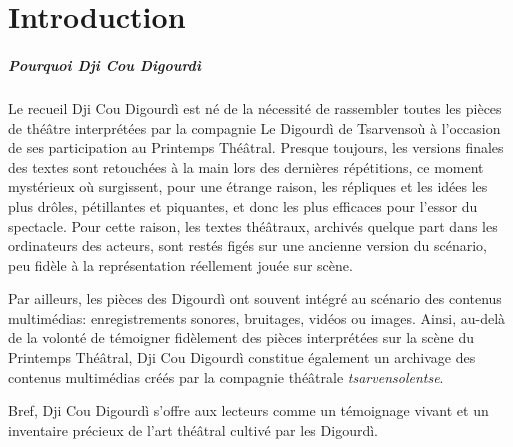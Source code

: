 \chapter*{\vspace*{-5mm} Introduction}





\paragraph*{Pourquoi Dji Cou Digourdì}
Le recueil Dji Cou Digourdì est né de la nécessité de rassembler toutes les pièces de théâtre interprétées par la compagnie Le Digourdì de Tsarvensoù à l'occasion de ses participation au Printemps Thé\^atral. Presque toujours, les versions finales des textes sont retouchées à la main lors des dernières répétitions, ce moment mystérieux où surgissent, pour une étrange raison, les répliques et les idées les plus drôles, pétillantes et piquantes, et donc les plus efficaces pour l’essor du spectacle. Pour cette raison, les textes théâtraux, archivés quelque part dans les ordinateurs des acteurs, sont restés figés sur une ancienne version du scénario, peu fidèle à la représentation réellement jouée sur scène.

Par ailleurs, les pièces des Digourdì ont souvent intégré au scénario des contenus multimédias: enregistrements sonores, bruitages, vidéos ou images. Ainsi, au-delà de la volonté de témoigner fidèlement des pièces interprétées sur la scène du Printemps Thé\^atral, Dji Cou Digourdì constitue également un archivage des contenus multimédias créés par la compagnie théâtrale \textit{tsarvensolentse}.

Bref, Dji Cou Digourdì s'offre aux lecteurs comme un témoignage vivant et un inventaire précieux de l'art théâtral cultivé par les Digourdì.

